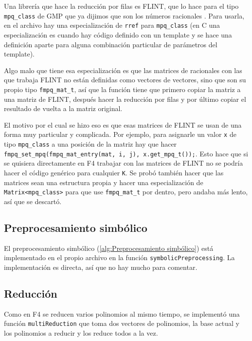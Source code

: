 \documentclass[12pt]{report}
\theoremstyle{customstyle}
\theoremstyle{factstyle}
\newcommand\cpp{C\nolinebreak[4]\hspace{-.05em}\raisebox{.4ex}{\relsize{-3}{\textbf{++}}}\xspace}
\begin{document}
Una librería que hace la reducción por filas es FLINT, que lo hace para el tipo \texttt{mpq\_class} de GMP que ya dijimos que son los números racionales \cite{lib:flint, lib:gmp}. Para usarla, en el archivo  hay una especialización de \texttt{rref} para \texttt{mpq\_class} (en \cpp una especialización es cuando hay código definido con un template y se hace una definición aparte para alguna combinación particular de parámetros del template).

Algo malo que tiene esa especialización es que las matrices de racionales con las que trabaja FLINT no están definidas como vectores de vectores, sino que son su propio tipo \texttt{fmpq\_mat\_t}, así que la función tiene que primero copiar la matriz a una matriz de FLINT, después hacer la reducción por filas y por último copiar el resultado de vuelta a la matriz original.

El motivo por el cual se hizo eso es que esas matrices de FLINT se usan de una forma muy particular y complicada. Por ejemplo, para asignarle un valor \texttt{x} de tipo \texttt{mpq\_class} a una posición de la matriz hay que hacer \texttt{fmpq\_set\_mpq(fmpq\_mat\_entry(mat, i, j), x.get\_mpq\_t());}. Esto hace que si se quisiera directamente en F4 trabajar con las matrices de FLINT no se podría hacer el código genérico para cualquier \texttt{K}. Se probó también hacer que las matrices sean una estructura propia y hacer una especialización de \texttt{Matrix<mpq\_class>} para que use \texttt{fmpq\_mat\_t} por dentro, pero andaba más lento, así que se descartó.

\subsection{Preprocesamiento simbólico}

El preprocesamiento simbólico (\cref{alg:Preprocesamiento simbólico}) está implementado en el propio archivo  en la función \texttt{symbolicPreprocessing}. La implementación es directa, así que no hay mucho para comentar.

\subsection{Reducción}

Como en F4 se reducen varios polinomios al mismo tiempo, se implementó una función \texttt{multiReduction} que toma dos vectores de polinomios, la base actual y los polinomios a reducir y los reduce todos a la vez.
\end{document}

